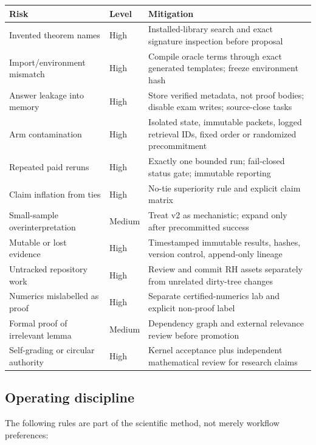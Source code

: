 \documentclass[11pt,a4paper]{article}
\begin{document}
\begin{longtable}{p{38mm}p{18mm}p{95mm}}
\toprule
Risk & Level & Mitigation \\
\midrule
\endhead
Invented theorem names & High & Installed-library search and exact signature inspection before proposal \\
Import/environment mismatch & High & Compile oracle terms through exact generated templates; freeze environment hash \\
Answer leakage into memory & High & Store verified metadata, not proof bodies; disable exam writes; source-close tasks \\
Arm contamination & High & Isolated state, immutable packets, logged retrieval IDs, fixed order or randomized precommitment \\
Repeated paid reruns & High & Exactly one bounded run; fail-closed status gate; immutable reporting \\
Claim inflation from ties & High & No-tie superiority rule and explicit claim matrix \\
Small-sample overinterpretation & Medium & Treat v2 as mechanistic; expand only after precommitted success \\
Mutable or lost evidence & High & Timestamped immutable results, hashes, version control, append-only lineage \\
Untracked repository work & High & Review and commit RH assets separately from unrelated dirty-tree changes \\
Numerics mislabelled as proof & High & Separate certified-numerics lab and explicit non-proof label \\
Formal proof of irrelevant lemma & Medium & Dependency graph and external relevance review before promotion \\
Self-grading or circular authority & High & Kernel acceptance plus independent mathematical review for research claims \\
\bottomrule
\end{longtable}

\subsection{Operating discipline}

The following rules are part of the scientific method, not merely workflow
preferences:
\end{document}
